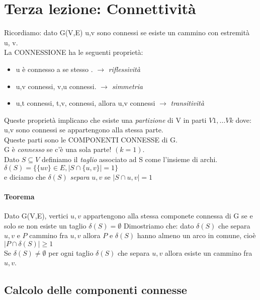 \section{Terza lezione: Connettività}

Ricordiamo: dato G(V,E) u,v sono connessi se esiste un cammino con estremità u, v. \\
La CONNESSIONE ha le seguenti proprietà:
\begin{itemize}
\item u è connesso a se stesso . \( \rightarrow \) \emph{riflessività}
\item u,v connessi, v,u connessi. \( \rightarrow \) \emph{simmetria} 
\item u,t connessi, t,v, connessi, allora u,v connessi \( \rightarrow \) \emph{transitività}
\end{itemize}
Queste proprietà implicano che esiste una \emph{partizione} di V in parti \(V1,...Vk \) dove: \\
u,v sono connessi se appartengono alla stessa parte. \\
Queste parti sono le COMPONENTI CONNESSE di G. \\
G è \emph{connesso} se c'è una sola parte! \((k=1)\). \\

Dato \( S \subseteq V \) definiamo il \emph{taglio} associato ad S come l'insieme di archi. \\
\( \delta(S) = \{ \{uv\} \in E , \mid S \cap \{u, v\} \mid = 1\} \) \\
e diciamo che $\delta(S)$ \emph{separa} $u,v$ se \( \mid S \cap u,v \mid =1 \) \\

\paragraph{Teorema} 
Dato G(V,E), vertici $u,v$ appartengono alla stessa componete connessa di G se e solo se non esiste un taglio $\delta(S) = \emptyset $
Dimostriamo che: dato $\delta(S)$ che separa $u,v$ e $P$ cammino fra $u,v$ allora $P$ e $\delta(S)$ hanno almeno un arco in comune, cioè \(\mid P \cap \delta(S) \mid \geq 1\)\\
Se $\delta(S) \neq \emptyset$ per ogni taglio $\delta(S)$ che separa $u,v$ allora esiste un cammino fra $u,v$. \\

\subsection{Calcolo delle componenti connesse}

